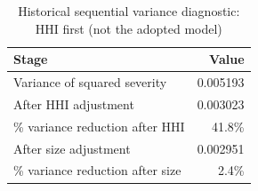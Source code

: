 \begin{table}[htbp]
\centering
\caption{Historical sequential variance diagnostic: HHI first (not the adopted model)}
\label{tab:variance_attribution_hhi_first}
\begin{tabular}{lr}
\toprule
\textbf{Stage} & \textbf{Value} \\
\midrule
Variance of squared severity & 0.005193 \\
After HHI adjustment & 0.003023 \\
\% variance reduction after HHI & 41.8\% \\
After size adjustment & 0.002951 \\
\% variance reduction after size & 2.4\% \\
\bottomrule
\end{tabular}
\end{table}
